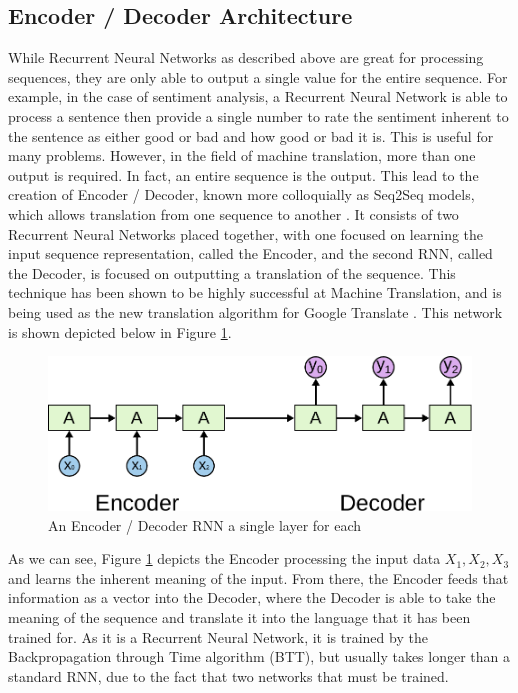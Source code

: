 \documentclass[pageno]{jpaper}
\begin{document}
\subsection{Encoder / Decoder Architecture}
While Recurrent Neural Networks as described above are great for processing sequences, they are only able to output a single value for the entire sequence.  For example, in the case of sentiment analysis, a Recurrent Neural Network is able to process a sentence then provide a single number to rate the sentiment inherent to the sentence as either good or bad and how good or bad it is.  This is useful for many problems.  However, in the field of machine translation, more than one output is required.  In fact, an entire sequence is the output.  This lead to the creation of Encoder / Decoder, known more colloquially as Seq2Seq models, which allows translation from one sequence to another \cite{cho:2014}.  It consists of two Recurrent Neural Networks placed together, with one focused on learning the input sequence representation, called the Encoder, and the second RNN, called the Decoder, is focused on outputting a translation of the sequence.  This technique has been shown to be highly successful at Machine Translation, and is being used as the new translation algorithm for Google Translate \cite{wu:2016}.  This network is shown depicted below in Figure \ref{fg:enc_dec}.
\begin{figure}[H]
	\centering
	\includegraphics[scale=1.0]{encoder_decoder.pdf}
	\vspace{1pc}
	\caption{An Encoder / Decoder RNN a single layer for each \cite{olah:2015}}
	\label{fg:enc_dec}
\end{figure}

As we can see, Figure \ref{fg:enc_dec} depicts the Encoder processing the input data $X_{1}, X_{2}, X_{3}$ and learns the inherent meaning of the input.  From there, the Encoder feeds that information as a vector into the Decoder, where the Decoder is able to take the meaning of the sequence and translate it into the language that it has been trained for.  As it is a Recurrent Neural Network, it is trained by the Backpropagation through Time algorithm (BTT), but usually takes longer than a standard RNN, due to the fact that two networks that must be trained.
\end{document}
